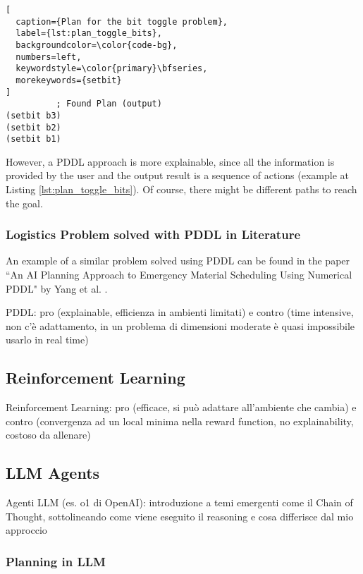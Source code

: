 \begin{lstlisting}[
  caption={Plan for the bit toggle problem},
  label={lst:plan_toggle_bits},
  backgroundcolor=\color{code-bg},
  numbers=left,
  keywordstyle=\color{primary}\bfseries,
  morekeywords={setbit}
]
          ; Found Plan (output)
(setbit b3)
(setbit b2)
(setbit b1)
\end{lstlisting}

However, a PDDL approach is more explainable, since all the information is
provided by the user and the output result is a sequence of actions (example at Listing
\ref{lst:plan_toggle_bits}). Of course, there might be different paths to reach
the goal.

\subsubsection{Logistics Problem solved with PDDL in Literature}
An example of a similar problem solved using PDDL can be found in the paper ``An
AI Planning Approach to Emergency Material Scheduling Using Numerical PDDL" by Yang
et al. \cite{Yang2022}.

PDDL: pro (explainable, efficienza in ambienti limitati) e contro (time intensive,
non c'è adattamento, in un problema di dimensioni moderate è quasi impossibile usarlo
in real time)

\subsection{Reinforcement Learning}
Reinforcement Learning: pro (efficace, si può adattare all'ambiente che cambia) e
contro (convergenza ad un local minima nella reward function, no explainability,
costoso da allenare)

\subsection{LLM Agents}
Agenti LLM (es. o1 di OpenAI): introduzione a temi emergenti come il Chain of
Thought, sottolineando come viene eseguito il reasoning e cosa differisce dal mio
approccio

\subsubsection{Planning in LLM}